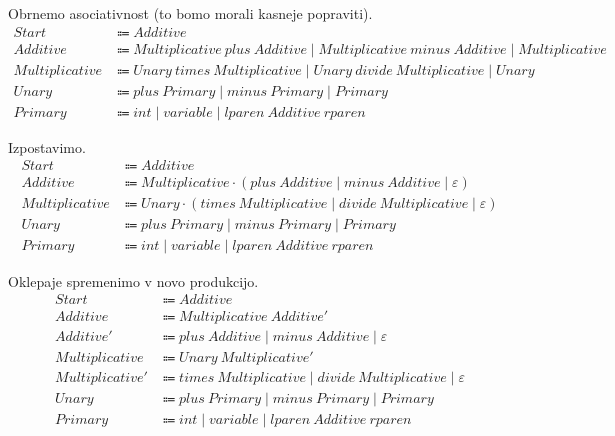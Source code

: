 \documentclass{report}
\newcommand{\Null}{\varepsilon}
\newcommand{\Seq}{\cdot}
\newcommand{\Spc}{\ }
\newcommand{\Union}{\mathrel{|}}
\newcommand{\Arrow}{\Coloneq}
\newcommand{\NT}[1]{{#1}}
\newcommand{\T}[1]{{#1}}
\begin{document}
Obrnemo asociativnost (to bomo morali kasneje popraviti).
\begin{align*}
  \NT{Start} &\Arrow \NT{Additive}\\
  \NT{Additive} &\Arrow \NT{Multiplicative} \Spc \T{plus} \Spc \NT{Additive} \Union \NT{Multiplicative} \Spc \T{minus} \Spc \NT{Additive} \Union \NT{Multiplicative}\\
  \NT{Multiplicative} &\Arrow \NT{Unary} \Spc \T{times} \Spc \NT{Multiplicative} \Union \NT{Unary} \Spc \T{divide} \Spc \NT{Multiplicative} \Union \NT{Unary}\\
  \NT{Unary} &\Arrow \T{plus} \Spc \NT{Primary} \Union \T{minus} \Spc \NT{Primary} \Union \NT{Primary}\\ 
  \NT{Primary} &\Arrow \T{int} \Union \T{variable} \Union \T{lparen} \Spc \NT{Additive} \Spc \T{rparen}
\end{align*}

Izpostavimo.
\begin{align*}
  \NT{Start} &\Arrow \NT{Additive}\\
  \NT{Additive} &\Arrow \NT{Multiplicative} \Seq (\T{plus} \Spc \NT{Additive} \Union \T{minus} \Spc \NT{Additive} \Union \Null)\\
  \NT{Multiplicative} &\Arrow \NT{Unary} \Seq (\T{times} \Spc \NT{Multiplicative} \Union \T{divide} \Spc \NT{Multiplicative} \Union \Null)\\
  \NT{Unary} &\Arrow \T{plus} \Spc \NT{Primary} \Union \T{minus} \Spc \NT{Primary} \Union \NT{Primary}\\ 
  \NT{Primary} &\Arrow \T{int} \Union \T{variable} \Union \T{lparen} \Spc \NT{Additive} \Spc \T{rparen}
\end{align*}

Oklepaje spremenimo v novo produkcijo.
\begin{align*}
  \NT{Start} &\Arrow \NT{Additive}\\
  \NT{Additive} &\Arrow \NT{Multiplicative} \Spc \NT{Additive'}\\
  \NT{Additive'} &\Arrow \T{plus} \Spc \NT{Additive} \Union \T{minus} \Spc \NT{Additive} \Union \Null\\
  \NT{Multiplicative} &\Arrow \NT{Unary} \Spc \NT{Multiplicative'}\\
  \NT{Multiplicative'} &\Arrow \T{times} \Spc \NT{Multiplicative} \Union \T{divide} \Spc \NT{Multiplicative} \Union \Null\\
  \NT{Unary} &\Arrow \T{plus} \Spc \NT{Primary} \Union \T{minus} \Spc \NT{Primary} \Union \NT{Primary}\\ 
  \NT{Primary} &\Arrow \T{int} \Union \T{variable} \Union \T{lparen} \Spc \NT{Additive} \Spc \T{rparen}
\end{align*}
\end{document}
